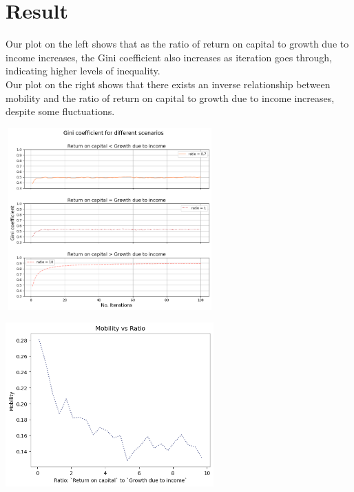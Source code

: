 \documentclass{article}
\begin{document}
\vspace{-0.4cm}




\section*{Result}
\vspace{-0.3cm}

Our plot on the left shows that as the ratio of return on capital to growth due to income increases, 
the Gini coefficient also increases as iteration goes through, indicating higher levels of inequality. \\
Our plot on the right shows that there exists an inverse relationship between mobility and the ratio of return on capital to growth due to income increases, despite some fluctuations. 

\vspace{0.3cm}
\includegraphics[width=8cm,height=7cm]{ratio_comparison.png}
\hspace{0.2cm}
\includegraphics[width=8cm,height=7cm]{Mobility.png}
\end{document}
